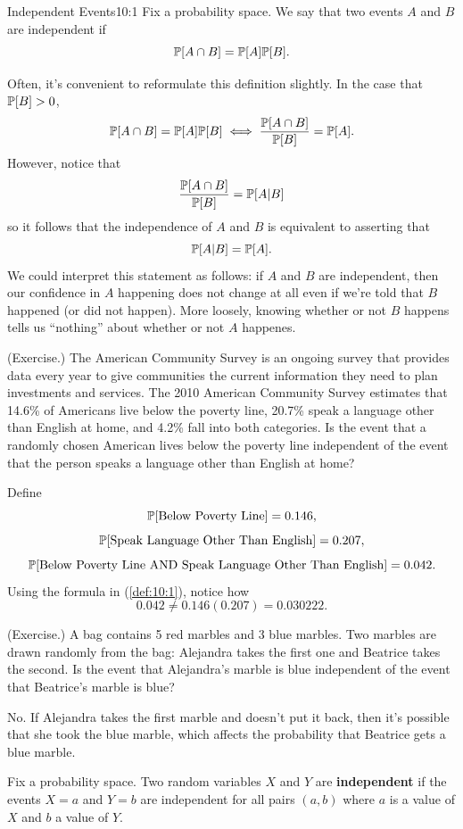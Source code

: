 \documentclass[letterpaper]{article}
\begin{document}
\begin{definition}{Independent Events}{10:1}
    Fix a probability space. We say that two events $A$ and $B$ are independent if 
    \[\mathbb{P}[A \cap B] = \mathbb{P}[A]\mathbb{P}[B].\]
\end{definition}
Often, it's convenient to reformulate this definition slightly. In the case that $\mathbb{P}[B] > 0$, \[\mathbb{P}[A \cap B] = \mathbb{P}[A] \mathbb{P}[B] \iff \frac{\mathbb{P}[A \cap B]}{\mathbb{P}[B]} = \mathbb{P}[A].\] However, notice that \[\frac{\mathbb{P}[A \cap B]}{\mathbb{P}[B]} = \mathbb{P}[A | B]\] so it follows that the independence of $A$ and $B$ is equivalent to asserting that \[\mathbb{P}[A | B] = \mathbb{P}[A].\] We could interpret this statement as follows: if $A$ and $B$ are independent, then our confidence in $A$ happening does not change at all even if we're told that $B$ happened (or did not happen). More loosely, knowing whether or not $B$ happens tells us ``nothing'' about whether or not $A$ happenes.

\begin{mdframed}
    (Exercise.) The American Community Survey is an ongoing survey that provides data every year to give communities the current information they need to plan investments and services. The 2010 American Community Survey estimates that 14.6\% of Americans live below the poverty line, 20.7\% speak a language other than English at home, and 4.2\% fall into both categories. Is the event that a randomly chosen American lives below the poverty line independent of the event that the person speaks a language other than English at home?

    \begin{mdframed}
        Define 
        \[\mathbb{P}[\text{Below Poverty Line}] = 0.146,\]
        \[\mathbb{P}[\text{Speak Language Other Than English}] = 0.207,\]
        \[\mathbb{P}[\text{Below Poverty Line AND Speak Language Other Than English}] = 0.042.\]
        Using the formula in (\ref{def:10:1}), notice how \[0.042 \neq 0.146(0.207) = 0.030222.\]
    \end{mdframed}
\end{mdframed}

\begin{mdframed}
    (Exercise.) A bag contains 5 red marbles and 3 blue marbles. Two marbles are drawn randomly from the bag: Alejandra takes the first one and Beatrice takes the second. Is the event that Alejandra's marble is blue independent of the event that Beatrice's marble is blue?

    \begin{mdframed}
        No. If Alejandra takes the first marble and doesn't put it back, then it's possible that she took the blue marble, which affects the probability that Beatrice gets a blue marble.
    \end{mdframed}
\end{mdframed}

\begin{definition}{}{}
    Fix a probability space. Two random variables $X$ and $Y$ are \textbf{independent} if the events $X = a$ and $Y = b$ are independent for all pairs $(a, b)$ where $a$ is a value of $X$ and $b$ a value of $Y$.
\end{definition}
\end{document}
